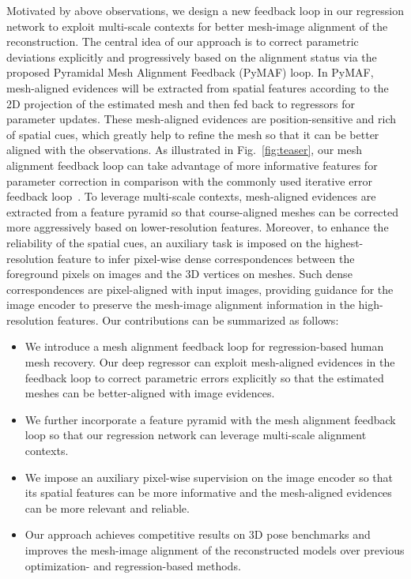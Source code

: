 \documentclass[10pt,twocolumn,letterpaper]{article}
\begin{document}
Motivated by above observations, we design a new feedback loop in our regression network to exploit multi-scale contexts for better mesh-image alignment of the reconstruction.
The central idea of our approach is to correct parametric deviations explicitly and progressively based on the alignment status via the proposed Pyramidal Mesh Alignment Feedback (PyMAF) loop.
In PyMAF, mesh-aligned evidences will be extracted from spatial features according to the 2D projection of the estimated mesh and then fed back to regressors for parameter updates.
These mesh-aligned evidences are position-sensitive and rich of spatial cues, which greatly help to refine the mesh so that it can be better aligned with the observations.
As illustrated in Fig.~\ref{fig:teaser}, our mesh alignment feedback loop can take advantage of more informative features for parameter correction in comparison with the commonly used iterative error feedback loop~\cite{kanazawa2018end}.
To leverage multi-scale contexts, mesh-aligned evidences are extracted from a feature pyramid so that course-aligned meshes can be corrected more aggressively based on lower-resolution features.
Moreover, to enhance the reliability of the spatial cues, an auxiliary task is imposed on the highest-resolution feature to infer pixel-wise dense correspondences between the foreground pixels on images and the 3D vertices on meshes.
Such dense correspondences are pixel-aligned with input images, providing guidance for the image encoder to preserve the mesh-image alignment information in the high-resolution features.
Our contributions can be summarized as follows:
\begin{itemize}[leftmargin=*]
\itemsep0em 
    \item We introduce a mesh alignment feedback loop for regression-based human mesh recovery.
    Our deep regressor can exploit mesh-aligned evidences in the feedback loop to correct parametric errors explicitly so that the estimated meshes can be better-aligned with image evidences.
    \item We further incorporate a feature pyramid with the mesh alignment feedback loop so that our regression network can leverage multi-scale alignment contexts.
    \item We impose an auxiliary pixel-wise supervision on the image encoder so that its spatial features can be more informative and the mesh-aligned evidences can be more relevant and reliable.
    \item Our approach achieves competitive results on 3D pose benchmarks and improves the mesh-image alignment of the reconstructed models over previous optimization- and regression-based methods.
\end{itemize}
 
\end{document}

